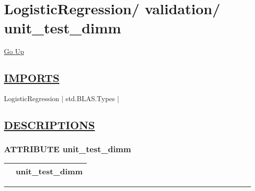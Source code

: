 \chapter*{\color{headfile}
{\large LogisticRegression\slash\hspace{0pt}}
{\large validation\slash\hspace{0pt}}
 \\
unit_test_dimm
}
\hypertarget{ecldoc:toc:LogisticRegression.validation.unit_test_dimm}{}
\hyperlink{ecldoc:toc:root/LogisticRegression/validation}{Go Up}

\section*{\underline{\textsf{IMPORTS}}}
\begin{doublespace}
{\large
LogisticRegression |
std.BLAS.Types |
}
\end{doublespace}

\section*{\underline{\textsf{DESCRIPTIONS}}}
\subsection*{\textsf{\colorbox{headtoc}{\color{white} ATTRIBUTE}
unit\_test\_dimm}}

\hypertarget{ecldoc:logisticregression.validation.unit_test_dimm}{}

{\renewcommand{\arraystretch}{1.5}
\begin{tabularx}{\textwidth}{|>{\raggedright\arraybackslash}l|X|}
\hline
\hspace{0pt}\mytexttt{\color{red} } & \textbf{unit\_test\_dimm} \\
\hline
\end{tabularx}
}

\par


\rule{\linewidth}{0.5pt}
